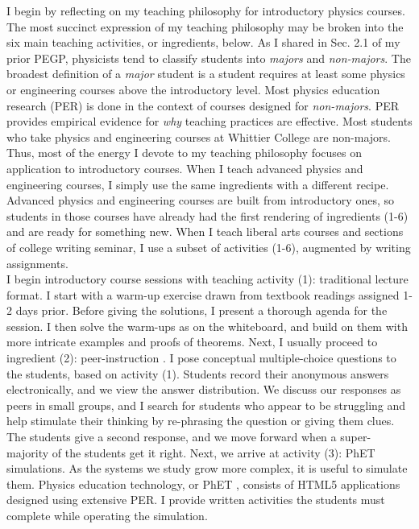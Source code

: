 \documentclass[../../../main.tex]{subfiles}
\begin{document}
I begin by reflecting on my teaching philosophy for introductory physics courses.  The most succinct expression of my teaching philosophy may be broken into the six main teaching activities, or ingredients, below.  As I shared in Sec. 2.1 of my prior PEGP, physicists tend to classify students into \textit{majors} and \textit{non-majors}.  The broadest definition of a \textit{major} student is a student requires at least some physics or engineering courses above the introductory level.  Most physics education research (PER) is done in the context of courses designed for \textit{non-majors}.  PER provides empirical evidence for \textit{why} teaching practices are effective.  Most students who take physics and engineering courses at Whittier College are non-majors.  Thus, most of the energy I devote to my teaching philosophy focuses on application to introductory courses.  When I teach advanced physics and engineering courses, I simply use the same ingredients with a different recipe.  Advanced physics and engineering courses are built from introductory ones, so students in those courses have already had the first rendering of ingredients (1-6) and are ready for something new.  When I teach liberal arts courses and sections of college writing seminar, I use a subset of activities (1-6), augmented by writing assignments.
\\
\vspace{0.25cm}
I begin introductory course sessions with teaching activity (1): traditional lecture format.  I start with a warm-up exercise drawn from textbook readings assigned 1-2 days prior.  Before giving the solutions, I present a thorough agenda for the session.  I then solve the warm-ups as on the whiteboard, and build on them with more intricate examples and proofs of theorems.  Next, I usually proceed to ingredient (2): peer-instruction \cite{mazur}.  I pose conceptual multiple-choice questions to the students, based on activity (1).  Students record their anonymous answers electronically, and we view the answer distribution.  We discuss our responses as peers in small groups, and I search for students who appear to be struggling and help stimulate their thinking by re-phrasing the question or giving them clues.  The students give a second response, and we move forward when a super-majority of the students get it right.  Next, we arrive at activity (3): PhET simulations.  As the systems we study grow more complex, it is useful to simulate them.  Physics education technology, or PhET \cite{phet}, consists of HTML5 applications designed using extensive PER.  I provide written activities the students must complete while operating the simulation.
\end{document}
